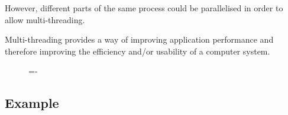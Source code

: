 \documentclass[a4paper]{systems-software}
\begin{document}
However, different parts of the same process could be parallelised in order to allow multi-threading.

Multi-threading provides a way of improving application performance and therefore improving the efficiency and/or usability of a computer system.

\begin{figure}[H]
  \lineskip=-\fboxrule
\end{figure}


\subsection*{Example}
\end{document}
